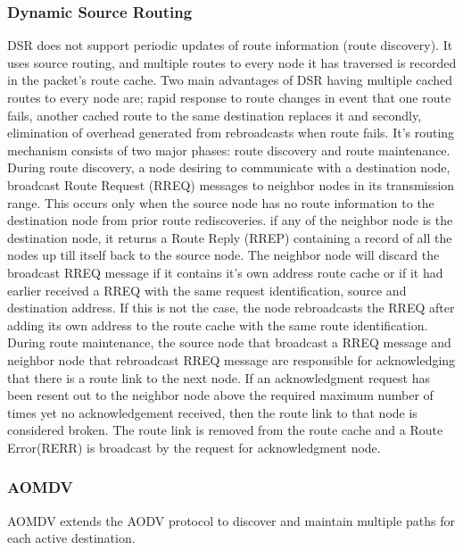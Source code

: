 \documentclass[letterpaper, 10 pt, conference]{ieeeconf}  %
\begin{document}
\subsubsection{Dynamic Source Routing}
DSR does not support periodic updates of route information (route discovery). It uses source routing, and multiple routes to every node it has traversed is recorded in the packet's route cache. Two main advantages of DSR having multiple cached routes to every node are; rapid response to route changes in event that one route fails, another cached route to the same destination replaces it and secondly, elimination of overhead generated from rebroadcasts when route fails. It's routing mechanism consists of two major phases: route discovery and route maintenance. During route discovery, a node desiring to communicate with a destination node, broadcast Route Request (RREQ) messages to neighbor nodes in its transmission range. This occurs only when the source node has no route information to the destination node from prior route rediscoveries. if any of the neighbor node is the destination node, it returns a Route Reply (RREP) containing a record of all the nodes up till itself back to the source node. The neighbor node will discard the broadcast RREQ message if it contains it's own address route cache or if it had earlier received a RREQ with the same request identification, source and destination address. If this is not the case, the node rebroadcasts the RREQ after adding its own address to the route cache with the same route identification. During route maintenance, the source node that broadcast a RREQ message and neighbor node that rebroadcast RREQ message are responsible for acknowledging that there is a route link to the next node. If an acknowledgment request has been resent out to the neighbor node above the required maximum number of times yet no acknowledgement received, then the route link to that node is considered broken. The route link is removed from the route cache and a Route Error(RERR) is broadcast by the request for acknowledgment node.





\subsubsection{AOMDV}





AOMDV extends the AODV protocol to discover and maintain multiple paths for each active  destination. 
\end{document}
